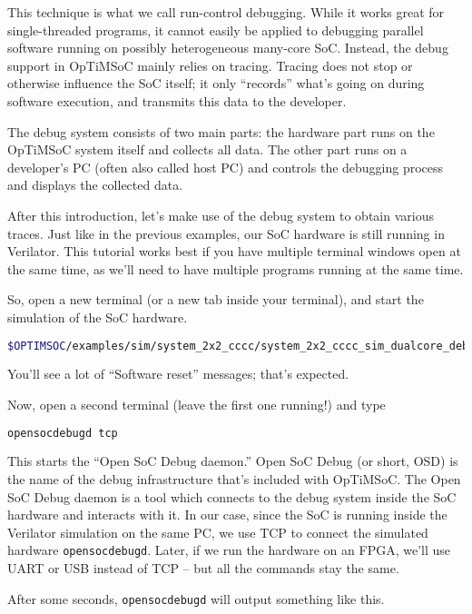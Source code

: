 This technique is what we call run-control debugging. While it works great for
single-threaded programs, it cannot easily be applied to debugging parallel
software running on possibly heterogeneous many-core SoC.
Instead, the debug support in OpTiMSoC mainly relies on tracing.
Tracing does not stop or otherwise influence the SoC itself; it only ``records'' what's going on during software execution, and transmits this data to the developer.

The debug system consists of two main parts: the hardware part runs on the
OpTiMSoC system itself and collects all data. The other part runs on a
developer's PC (often also called host PC) and controls the debugging process
and displays the collected data.

\medskip

After this introduction, let's make use of the debug system to obtain various traces.
Just like in the previous examples, our SoC hardware is still running in Verilator.
This tutorial works best if you have multiple terminal windows open at the same time, as we'll need to have multiple programs running at the same time.

So, open a new terminal (or a new tab inside your terminal), and start the simulation of the SoC hardware.
\begin{lstlisting}[language=sh]
$OPTIMSOC/examples/sim/system_2x2_cccc/system_2x2_cccc_sim_dualcore_debug
\end{lstlisting}

You'll see a lot of ``Software reset'' messages; that's expected.

Now, open a second terminal (leave the first one running!) and type
\begin{lstlisting}[language=sh]
opensocdebugd tcp
\end{lstlisting}

This starts the ``Open SoC Debug daemon.''
Open SoC Debug (or short, OSD) is the name of the debug infrastructure that's included with OpTiMSoC.
The Open SoC Debug daemon is a tool which connects to the debug system inside the SoC hardware and interacts with it.
In our case, since the SoC is running inside the Verilator simulation on the same PC, we use TCP to connect the simulated hardware \verb|opensocdebugd|.
Later, if we run the hardware on an FPGA, we'll use UART or USB instead of TCP -- but all the commands stay the same.

After some seconds, \verb|opensocdebugd| will output something like this.

